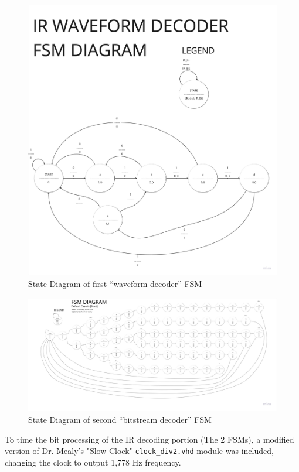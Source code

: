 \documentclass[
    a4paper, %
	12pt, %
    ]{CSSullivanBusinessReport}
\begin{document}
    \begin{figure}[h]
        \centering
        \includegraphics[width=.8\textwidth]{Figures/FSM Decoder Diagram.jpg}
        \caption{State Diagram of first “waveform decoder” FSM}
        \label{fig:lowlevelblockdiagram}
    \end{figure}

    \begin{figure}[h]
        \centering
        \includegraphics[width=.8\pdfpagewidth]{Figures/FSM Decoder Diagram High Res.jpg}
        \caption{State Diagram of second “bitstream decoder” FSM}
        \label{fig:lowlevelblockdiagram}
    \end{figure}

    \newpage

    To time the bit processing of the IR decoding portion (The 2 FSMs), a modified version of Dr. Mealy's "Slow Clock" \verb|clock_div2.vhd| module was included, changing the clock to output 1,778 Hz frequency.
\end{document}
